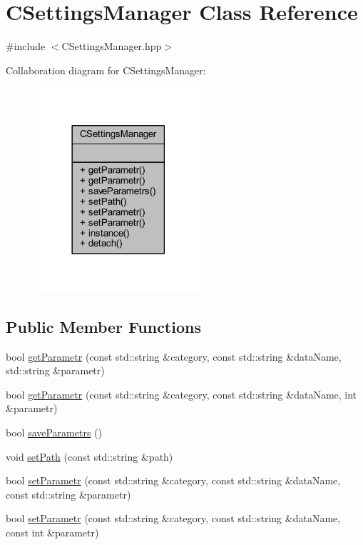 \hypertarget{class_c_settings_manager}{}\section{C\+Settings\+Manager Class Reference}
\label{class_c_settings_manager}


{\ttfamily \#include $<$C\+Settings\+Manager.\+hpp$>$}



Collaboration diagram for C\+Settings\+Manager\+:
\nopagebreak
\begin{figure}[H]
\begin{center}
\leavevmode
\includegraphics[width=177pt]{class_c_settings_manager__coll__graph}
\end{center}
\end{figure}
\subsection*{Public Member Functions}
\begin{DoxyCompactItemize}
\item 
bool \mbox{\hyperlink{class_c_settings_manager_ad0796e880134f641f6517d9a5433a877}{get\+Parametr}} (const std\+::string \&category, const std\+::string \&data\+Name, std\+::string \&parametr)
\item 
bool \mbox{\hyperlink{class_c_settings_manager_a6f45d4eaf3c79250f41bbac303b7c485}{get\+Parametr}} (const std\+::string \&category, const std\+::string \&data\+Name, int \&parametr)
\item 
bool \mbox{\hyperlink{class_c_settings_manager_a874956b5cb03b94bbb85ae0a5b25733f}{save\+Parametrs}} ()
\item 
void \mbox{\hyperlink{class_c_settings_manager_af67d1a3761332974fa0133e9d9819035}{set\+Path}} (const std\+::string \&path)
\item 
bool \mbox{\hyperlink{class_c_settings_manager_aa9efd965120731844f8ff2c2c994e638}{set\+Parametr}} (const std\+::string \&category, const std\+::string \&data\+Name, const std\+::string \&parametr)
\item 
bool \mbox{\hyperlink{class_c_settings_manager_a220fab46b436b6ded0ef311515a66899}{set\+Parametr}} (const std\+::string \&category, const std\+::string \&data\+Name, const int \&parametr)
\end{DoxyCompactItemize}
